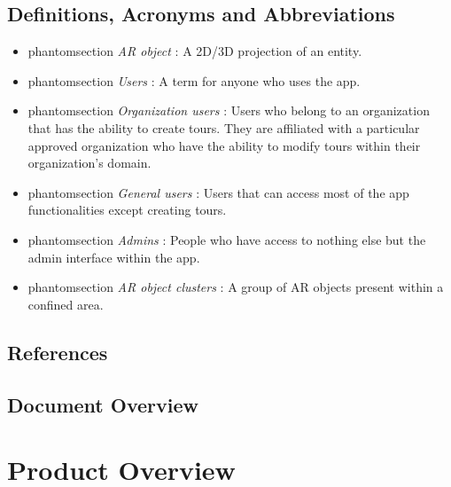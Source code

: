 \documentclass{article}
\makeatletter
\newcommand{\labeltext}[3][]{%
    \@bsphack%
    \csname phantomsection\endcsname%
    \def\tst{#1}%
    \def\labelmarkup{\emph}%
    \def\refmarkup{}%
    \ifx\tst\empty\def\@currentlabel{\refmarkup{#2}}{\label{#3}}%
    \else\def\@currentlabel{\refmarkup{#1}}{\label{#3}}\fi%
    \@esphack%
    \labelmarkup{#2}%
}
\makeatother
\begin{document}
\subsection{Definitions, Acronyms and Abbreviations}
\label{sub:def_acr_abb}

\begin{itemize}
    \item \labeltext{AR object}{def:ar_obj}: A 2D/3D projection of an entity.
    \item \labeltext{Users}{def:user}: A term for anyone who uses the app.
    \item \labeltext{Organization users}{def:org_user}: Users who belong to an organization that has the ability to create tours. They are affiliated with a particular approved organization who have the ability to modify tours within their organization’s domain.
    \item \labeltext{General users}{def:gen_user}: Users that can access most of the app functionalities except creating tours.
    \item \labeltext{Admins}{def:admin}: People who have access to nothing else but the admin interface within the app.
    \item \labeltext{AR object clusters}{def:ar_obj_cls}: A group of AR objects present within a confined area.
\end{itemize}

\subsection{References}
\label{sub:references}


\begingroup
\raggedright

\endgroup


\subsection{Document Overview}


\section{Product Overview}
\end{document}
